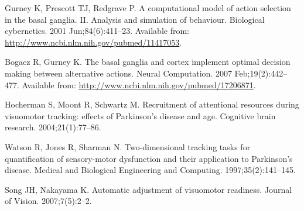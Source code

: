 \documentclass[10pt,letterpaper]{article}
\providecommand{\DIFdelbegin}{} %
\providecommand{\DIFdelend}{} %
\begin{document}
\begin{thebibliography}{10}
Gurney K, Prescott TJ, Redgrave P.
\newblock A computational model of action selection in the basal ganglia. {II}.
  {Analysis} and simulation of behaviour.
\newblock Biological cybernetics. 2001 Jun;84(6):411--23.
\newblock Available from: \url{http://www.ncbi.nlm.nih.gov/pubmed/11417053}.

Bogacz R, Gurney K.
\newblock The basal ganglia and cortex implement optimal decision making
  between alternative actions.
\newblock Neural Computation. 2007 Feb;19(2):442--477.
\newblock Available from: \url{http://www.ncbi.nlm.nih.gov/pubmed/17206871}.

Hocherman S, Moont R, Schwartz M.
\newblock Recruitment of attentional resources during visuomotor tracking:
  effects of {Parkinson}'s disease and age.
\newblock Cognitive brain research. 2004;21(1):77--86.

Watson R, Jones R, Sharman N.
\newblock Two-dimensional tracking tasks for quantification of sensory-motor
  dysfunction and their application to {Parkinson}'s disease.
\newblock Medical and Biological Engineering and Computing.
  1997;35(2):141--145.

Song JH, Nakayama K.
\newblock Automatic adjustment of visuomotor readiness.
\newblock Journal of Vision. 2007;7(5):2--2.

\end{thebibliography}
\DIFdelbegin %

\DIFdelend 
\end{document}
